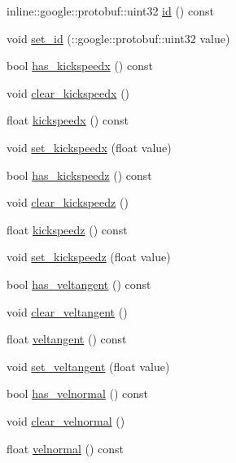 \begin{DoxyCompactItemize}
\item 
inline\-::google\-::protobuf\-::uint32 \hyperlink{classgr_sim___robot___command_aab99e1956ec792ac1d52828dc0661ea6}{id} () const 
\item 
void \hyperlink{classgr_sim___robot___command_a382b56002691a86edee454d6ac2daaf3}{set\-\_\-id} (\-::google\-::protobuf\-::uint32 value)
\item 
bool \hyperlink{classgr_sim___robot___command_a49ff9d098f215809aa0f2248eec7dd6c}{has\-\_\-kickspeedx} () const 
\item 
void \hyperlink{classgr_sim___robot___command_af5b1f9dbc8728ce16f0d5a6de5066a32}{clear\-\_\-kickspeedx} ()
\item 
float \hyperlink{classgr_sim___robot___command_abb15aaf9507c99260b46c1f1148c7e3d}{kickspeedx} () const 
\item 
void \hyperlink{classgr_sim___robot___command_a408ee98549c70f70568cf5bfc595e0d8}{set\-\_\-kickspeedx} (float value)
\item 
bool \hyperlink{classgr_sim___robot___command_a36d3e944e308139b3d0b30abf983c8ca}{has\-\_\-kickspeedz} () const 
\item 
void \hyperlink{classgr_sim___robot___command_a55ec520502ff4a23d7cfa23f3e92e182}{clear\-\_\-kickspeedz} ()
\item 
float \hyperlink{classgr_sim___robot___command_a00a630ccbfbcb9c1671b873d400ee67e}{kickspeedz} () const 
\item 
void \hyperlink{classgr_sim___robot___command_a4d64c7c92be5345494bdf00e40fb7203}{set\-\_\-kickspeedz} (float value)
\item 
bool \hyperlink{classgr_sim___robot___command_aa024007c788f05dde3405199d86f7c16}{has\-\_\-veltangent} () const 
\item 
void \hyperlink{classgr_sim___robot___command_a79492af5b555288217e8d0e3a21a1cb3}{clear\-\_\-veltangent} ()
\item 
float \hyperlink{classgr_sim___robot___command_aca703884e9e92f41d443558c2ce61219}{veltangent} () const 
\item 
void \hyperlink{classgr_sim___robot___command_afd1c67858cf6f361688d502e6b31d965}{set\-\_\-veltangent} (float value)
\item 
bool \hyperlink{classgr_sim___robot___command_a4be6d28b85530423946c89d0176af1fc}{has\-\_\-velnormal} () const 
\item 
void \hyperlink{classgr_sim___robot___command_a793cdca763ed5218125c701f6c46a4d9}{clear\-\_\-velnormal} ()
\item 
float \hyperlink{classgr_sim___robot___command_ac9a201e96f308dd2f2377802cf000467}{velnormal} () const 

\end{DoxyCompactItemize}
